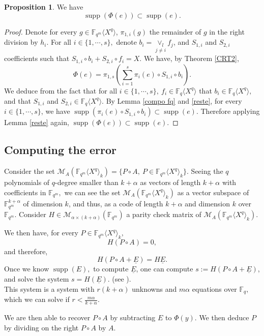 \documentclass{article}
\newcommand{\Fq}{\mathbb{F}_q}
\newcommand{\Fqm}{\mathbb{F}_{q^m}}
\newcommand{\QP}{\mathbb{F}_{q^m} \langle X^q \rangle}
\newcommand{\supp}{\operatorname{supp}}
\theoremstyle{definition}
\newtheorem{proposition}[theorem]{Proposition}
\begin{document}
\begin{proposition} \label{inclusion support}
      We have \[ \supp(\Phi(e)) \subset \supp(e).\]
\end{proposition}
\begin{proof}
      Denote for every $g \in \QP$, $\pi_{1,i}(g)$ the remainder of $g$ in the right division by $h_i.$ For all $i \in \{1, \cdots, s\},$ denote $b_i = \underset{j \neq i}{\vee_l} f_j$, and  $S_{1,i}$ and $S_{2,i}$  coefficients such that $S_{1,i} \circ  b_i + S_{2,i} \circ f_i = X. $
      We have, by Theorem \ref{CRT2},\[ \Phi(e) = \pi_{1,s}(\sum_{i=1}^s \pi_i(e) \circ S_{1,i} \circ b_i).\]
      We deduce from the fact that for all $i \in \{1, \cdots, s \}, ~ f_i \in \Fq\langle X^q \rangle$ that $b_i \in \Fq\langle X^q \rangle,$ and that $S_{1,i}$ and $S_{2,i}\in \Fq\langle X^q \rangle$. By Lemma \ref{compo fq} and \ref{reste}, for every $ i \in \{ 1, \cdots,s\}$, we have $\supp(  \pi_i(e) \circ S_{1,i} \circ b_i) \subset \supp(e).$ Therefore  applying Lemma \ref{reste} again, $\supp(\Phi(e)) \subset \supp(e).$
\end{proof}

\subsection{Computing the error}

Consider the set $\mathcal{M}_A(\QP_{k}) = \{P \circ A,~ P \in \QP_{k} \} $. Seeing the $q$ polynomials of $q$-degree smaller than $k+\alpha$ as vectors of length $k+\alpha$ with coefficients in $\Fqm,$ we can see the set $\mathcal{M}_A(\QP_{k})$ as a vector subspace of $\Fqm^{k+\alpha}$ of dimension $k$, and thus, as a code of length $k+\alpha$ and dimension $k$ over $\Fqm$. Consider $H \in \mathcal{M}_{\alpha \times (k+\alpha) }(\Fqm)$ a parity check matrix of $\mathcal{M}_A(\QP_{k})$.

\noindent We then have, for every $P \in \QP_{k}, $ \[ H(P\circ A) =0, \] and therefore,  \[ H(P\circ A + \underline{E}) = H \underline{E}.  \]
Once we know $\supp(E),$ to compute $\underline{E}$, one can compute $s:= H(P\circ A + \underline{E})$, and solve the system $s= H(\underline{E}).$ (see \cite{gaborit_low_2013}). \\
This system is a system with $r(k+\alpha)$ unknowns and $m\alpha$ equations over $\Fq,$ which we can solve if $r<\frac{m\alpha}{k+\alpha}.$

\noindent We are then able to recover $P\circ A$ by subtracting $E$ to $\Phi(y).$ We then deduce $P$ by dividing on the right $P\circ A$ by $A$. \\
\end{document}
